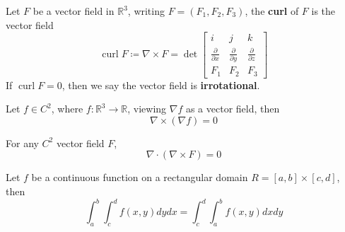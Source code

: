 \documentclass[openany]{book}
\newcommand{\R}{\mathbb{R}}
\newcommand{\curl}{\operatorname{curl}}
\begin{document}
\begin{defn}[curl]
    Let $F$ be a vector field in $\R^3$, writing $F=(F_1,F_2,F_3)$, the \textbf{curl} of $F$ is the vector field 
    \begin{equation*}
        \curl F\coloneq\nabla\times F=\det\begin{bmatrix}
            i&j&k\\
            \frac{\partial}{\partial x}&\frac{\partial}{\partial y}&\frac{\partial}{\partial z}\\
            F_1&F_2&F_3
        \end{bmatrix}
    \end{equation*}
    If $\curl F=0$, then we say the vector field is \textbf{irrotational}.
\end{defn}

\begin{prop}
    Let $f\in C^2$, where $f:\R^3\to\R$, viewing $\nabla f$ as a vector field, then
    \begin{equation*}
        \nabla\times(\nabla f)=0
    \end{equation*}    
\end{prop}

\begin{prop}
    For any $C^2$ vector field $F$, 
    \begin{equation*}
        \nabla\cdot(\nabla\times F)=0
    \end{equation*}
\end{prop}


\begin{prop}
    Let $f$ be a continuous function on a rectangular domain $R=[a,b]\times[c,d]$, then 
    \begin{equation*}
        \int_a^b\int_c^df(x,y)dydx=\int_c^d\int_a^bf(x,y)dxdy
    \end{equation*}
\end{prop}
\end{document}
